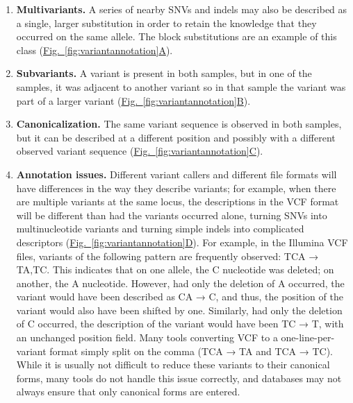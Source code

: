 \begin{enumerate}
\item \textbf {Multivariants.} A series of nearby SNVs and indels may also be described as a single, larger substitution in order to retain the knowledge that they occurred on the same allele. The block substitutions are an example of this class (\hyperref[fig:variantannotation]{Fig.~\ref{fig:variantannotation}A}).

\item \textbf{Subvariants.} A variant is present in both samples, but in one of the samples, it was adjacent to another variant so in that sample the variant was part of a larger variant (\hyperref[fig:variantannotation]{Fig.~\ref{fig:variantannotation}B}).

\item \textbf{Canonicalization.} The same variant sequence is observed in both samples, but it can be described at a different position and possibly with a different observed variant sequence (\hyperref[fig:variantannotation]{Fig.~\ref{fig:variantannotation}C}).

\item \textbf{Annotation issues.} Different variant callers and different file formats will have differences in the way they describe variants; for example, when there are multiple variants at the same locus, the descriptions in the VCF format will be different than had the variants occurred alone, turning SNVs into multinucleotide variants and turning simple indels into complicated descriptors (\hyperref[fig:variantannotation]{Fig.~\ref{fig:variantannotation}D}). For example, in the Illumina VCF files, variants of the following pattern are frequently observed: TCA → TA,TC\@. This indicates that on one allele, the C nucleotide was deleted; on another, the A nucleotide. However, had only the deletion of A occurred, the variant would have been described as CA → C, and thus, the position of the variant would also have been shifted by one. Similarly, had only the deletion of C occurred, the description of the variant would have been TC → T, with an unchanged position field. Many tools converting VCF to a one-line-per-variant format simply split on the comma (TCA → TA and TCA → TC). While it is usually not difficult to reduce these variants to their canonical forms, many tools do not handle this issue correctly, and databases may not always ensure that only canonical forms are entered.
\end{enumerate}

